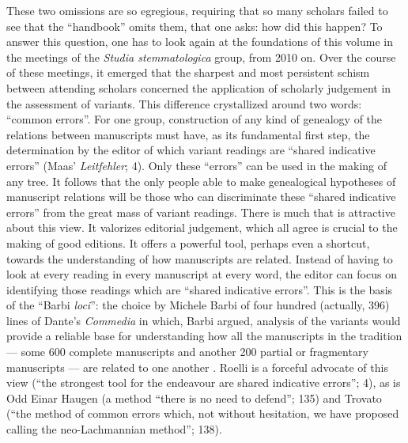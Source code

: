 \documentclass{article}
\begin{document}
These two omissions are so egregious, requiring that so many
scholars failed to see that the ``handbook'' omits them, that one asks:
how did this happen? To answer this question, one has to look again at
the foundations of this volume in the meetings of the \emph{Studia
stemmatologica} group, from 2010 on. Over the course of these meetings,
it emerged that the sharpest and most persistent schism between
attending scholars concerned the application of scholarly judgement in
the assessment of variants. This difference crystallized around two
words: ``common errors''. For one group, construction of any kind of
genealogy of the relations between manuscripts must have, as its
fundamental first step, the determination by the editor of which variant
readings are ``shared indicative errors'' (Maas' \emph{Leitfehler}; 4).
Only these ``errors'' can be used in the making of any tree. It follows
that the only people able to make genealogical hypotheses of manuscript
relations will be those who can discriminate these ``shared indicative
errors'' from the great mass of variant readings. There is much that is
attractive about this view. It valorizes editorial judgement, which all
agree is crucial to the making of good editions. It offers a powerful
tool, perhaps even a shortcut, towards the understanding of how
manuscripts are related. Instead of having to look at every reading in
every manuscript at every word, the editor can focus on identifying
those readings which are ``shared indicative errors''. This is the basis
of the ``Barbi \emph{loci}'': the choice by Michele Barbi of four
hundred (actually, 396) lines of Dante's \emph{Commedia} in which, Barbi
argued, analysis of the variants would provide a reliable base for
understanding how all the manuscripts in the tradition –– some 600
complete manuscripts and another 200 partial or fragmentary manuscripts
–– are related to one another \parencite{barbi_canone_1891}. Roelli is a forceful
advocate of this view (``the strongest tool for the endeavour are shared
indicative errors''; 4), as is Odd Einar Haugen (a method ``there is no
need to defend''; 135) and Trovato (``the method of common errors which,
not without hesitation, we have proposed calling the neo-Lachmannian
method''; 138).
\end{document}
